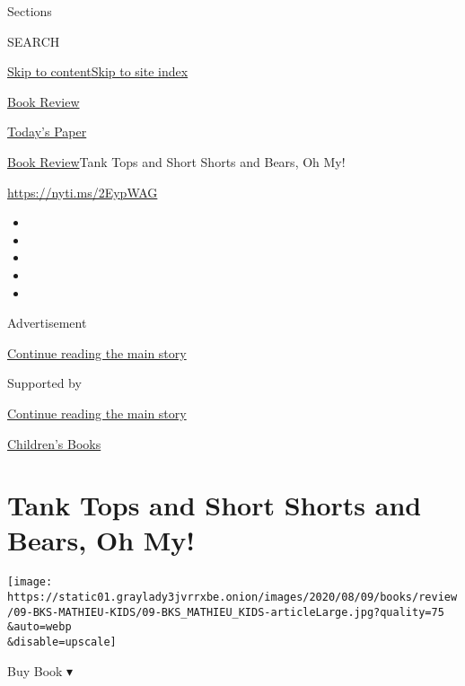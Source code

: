 Sections

SEARCH

\protect\hyperlink{site-content}{Skip to
content}\protect\hyperlink{site-index}{Skip to site index}

\href{https://www.nytimes3xbfgragh.onion/section/books/review}{Book
Review}

\href{https://myaccount.nytimes3xbfgragh.onion/auth/login?response_type=cookie\&client_id=vi}{}

\href{https://www.nytimes3xbfgragh.onion/section/todayspaper}{Today's
Paper}

\href{/section/books/review}{Book Review}\textbar{}Tank Tops and Short
Shorts and Bears, Oh My!

\url{https://nyti.ms/2EypWAG}

\begin{itemize}
\item
\item
\item
\item
\item
\end{itemize}

Advertisement

\protect\hyperlink{after-top}{Continue reading the main story}

Supported by

\protect\hyperlink{after-sponsor}{Continue reading the main story}

\href{/column/childrens-books}{Children's Books}

\hypertarget{tank-tops-and-short-shorts-and-bears-oh-my}{%
\section{Tank Tops and Short Shorts and Bears, Oh
My!}\label{tank-tops-and-short-shorts-and-bears-oh-my}}

\texttt{[image: https://static01.graylady3jvrrxbe.onion/images/2020/08/09/books/review/09-BKS-MATHIEU-KIDS/09-BKS\_MATHIEU\_KIDS-articleLarge.jpg?quality=75\\\&auto=webp\\\&disable=upscale]}

Buy Book ▾

